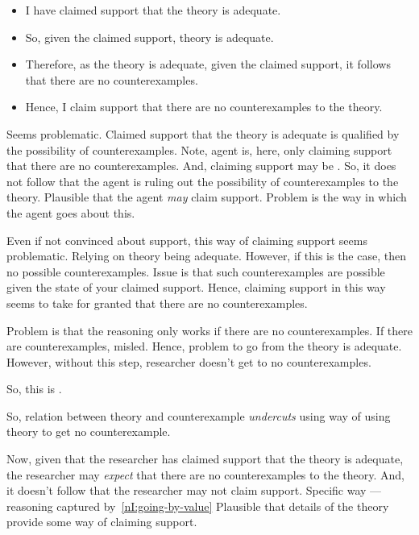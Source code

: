 \begin{note}
\begin{illustration}
    \begin{itemize}
    \item I have claimed support that the theory is adequate.
    \item So, given the claimed support, theory is adequate.
    \item Therefore, as the theory is adequate, given the claimed support, it follows that there are no counterexamples.
    \item Hence, I claim support that there are no counterexamples to the theory.
    \end{itemize}

    Seems problematic.
    Claimed support that the theory is adequate is qualified by the possibility of counterexamples.
    {
      \color{red}
      Note, agent is, here, only claiming support that there are no counterexamples.
      And, claiming support may be \mom{}.
      So, it does not follow that the agent is ruling out the possibility of counterexamples to the theory.
      Plausible that the agent \emph{may} claim support.
      Problem is the way in which the agent goes about this.
    }

    {
      Even if not convinced about support, this way of claiming support seems problematic.
      Relying on theory being adequate.
      However, if this is the case, then no possible counterexamples.
      Issue is that such counterexamples are possible given the state of your claimed support.
      Hence, claiming support in this way seems to take for granted that there are no counterexamples.
    }

    Problem is that the reasoning only works if there are no counterexamples.
    If there are counterexamples, misled.
    Hence, problem to go from the theory is adequate.
    However, without this step, researcher doesn't get to no counterexamples.

    So, this is \eiS{}.
  \end{illustration}

  So, relation between theory and counterexample \emph{undercuts} using way of using theory to get no counterexample.

  Now, given that the researcher has claimed support that the theory is adequate, the researcher may \emph{expect} that there are no counterexamples to the theory.
  And, it doesn't follow that the researcher may not claim support.
  Specific way --- reasoning captured by~\ref{nI:going-by-value}
  Plausible that details of the theory provide some way of claiming support.


\end{note}
